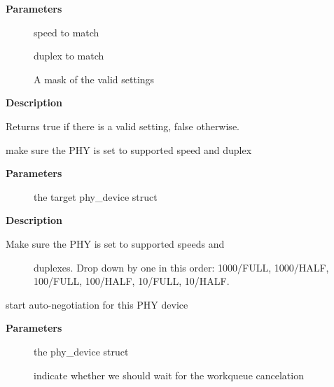 \documentclass[a4paper,8pt,english]{sphinxmanual}
\begin{document}
\textbf{Parameters}
\begin{description}
\item[{}] \leavevmode
speed to match

\item[{}] \leavevmode
duplex to match

\item[{}] \leavevmode
A mask of the valid settings

\end{description}

\textbf{Description}

Returns true if there is a valid setting, false otherwise.

\begin{fulllineitems}
\label{networking/kapi:c.phy_sanitize_settings}
make sure the PHY is set to supported speed and duplex

\end{fulllineitems}


\textbf{Parameters}
\begin{description}
\item[{}] \leavevmode
the target phy\_device struct

\end{description}

\textbf{Description}
\begin{description}
\item[{Make sure the PHY is set to supported speeds and}] \leavevmode
duplexes.  Drop down by one in this order:  1000/FULL,
1000/HALF, 100/FULL, 100/HALF, 10/FULL, 10/HALF.

\end{description}

\begin{fulllineitems}
\label{networking/kapi:c.phy_start_aneg_priv}
start auto-negotiation for this PHY device

\end{fulllineitems}


\textbf{Parameters}
\begin{description}
\item[{}] \leavevmode
the phy\_device struct

\item[{}] \leavevmode
indicate whether we should wait for the workqueue cancelation

\end{description}
\end{document}
